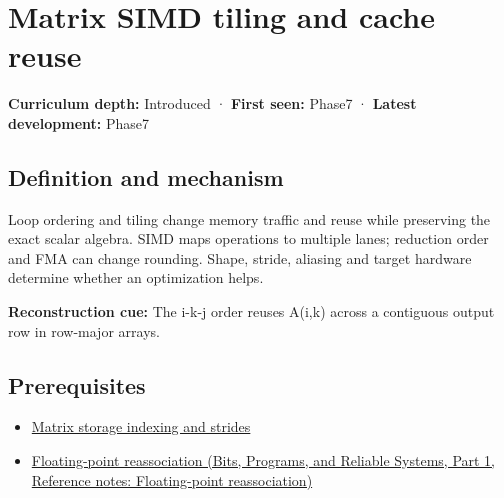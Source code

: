 \hypertarget{appendix-1bfb7c657105}{}\label{referencestart:appendix-1bfb7c657105}
\section{Matrix SIMD tiling and cache reuse}\label{appendix-1bfb7c657105-matrix-simd-tiling-and-cache-reuse}

\hypertarget{appendix-1bfb7c657105-matrix-simd-tiling-and-cache-reuse}{}

\textbf{Curriculum depth:} Introduced · \textbf{First seen:} Phase7 · \textbf{Latest development:} Phase7

\begin{allmightroledefinition}

\subsection{Definition and mechanism}\label{appendix-1bfb7c657105-definition-and-mechanism}

\hypertarget{appendix-1bfb7c657105-definition-and-mechanism}{}

Loop ordering and tiling change memory traffic and reuse while preserving the exact scalar algebra. SIMD maps operations to multiple lanes; reduction order and FMA can change rounding. Shape, stride, aliasing and target hardware determine whether an optimization helps.

\end{allmightroledefinition}

\textbf{Reconstruction cue:} The i-k-j order reuses A(i,k) across a contiguous output row in row-major arrays.

\subsection{Prerequisites}\label{appendix-1bfb7c657105-prerequisites}

\hypertarget{appendix-1bfb7c657105-prerequisites}{}

\begin{itemize}
\tightlist
\item
  \hyperref[appendix-ffdc1d4e5350]{Matrix storage indexing and strides}
\item
  \href{../01-Bits-Programs-and-Reliable-Systems-P01/main.pdf\#appendix-c2ac4a84c283}{Floating-point reassociation (Bits, Programs, and Reliable Systems, Part 1, Reference notes: Floating-point reassociation)}
\end{itemize}

